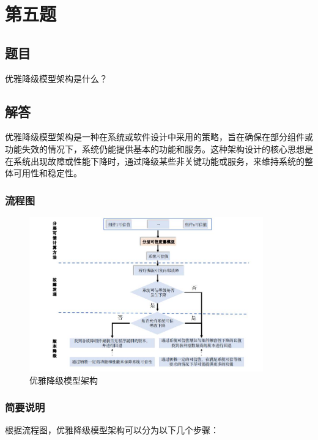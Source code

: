 \documentclass{article}
\begin{document}
\section{第五题}

\subsection{题目}

优雅降级模型架构是什么？

\subsection{解答}

优雅降级模型架构是一种在系统或软件设计中采用的策略，旨在确保在部分组件或功能失效的情况下，系统仍能提供基本的功能和服务。这种架构设计的核心思想是在系统出现故障或性能下降时，通过降级某些非关键功能或服务，来维持系统的整体可用性和稳定性。

\subsubsection{流程图}

\begin{figure}[H]
	\centering
	\includegraphics[width=0.9\textwidth]{img/01.png}
	\caption{优雅降级模型架构}
\end{figure}

\subsubsection{简要说明}

根据流程图，优雅降级模型架构可以分为以下几个步骤：
\end{document}
